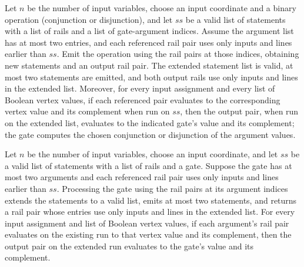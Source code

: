 \begin{theorem}
\label{BoolCircuit.StraightLine.emitOp_spec}
\leanok
{}
Let $n$ be the number of input variables, choose an input coordinate and a binary
operation (conjunction or disjunction), and let $ss$ be a valid list of statements with
a list of rails and a list of gate-argument indices. Assume the argument list has at
most two entries, and each referenced rail pair uses only inputs and lines earlier than
$ss$. Emit the operation using the rail pairs at those indices, obtaining new statements
and an output rail pair. The extended statement list is valid, at most two statements
are emitted, and both output rails use only inputs and lines in the extended list.
Moreover, for every input assignment and every list of Boolean vertex values, if each
referenced pair evaluates to the corresponding vertex value and its complement when run
on $ss$, then the output pair, when run on the extended list, evaluates to the indicated
gate's value and its complement; the gate computes the chosen conjunction or disjunction
of the argument values.
\end{theorem}

\begin{theorem}
\label{BoolCircuit.StraightLine.gateEmit_spec}
\leanok
{}
Let $n$ be the number of input variables, choose an input coordinate, and let $ss$ be a
valid list of statements with a list of rails and a gate. Suppose the gate has at most
two arguments and each referenced rail pair uses only inputs and lines earlier than
$ss$. Processing the gate using the rail pairs at its argument indices extends the
statements to a valid list, emits at most two statements, and returns a rail pair whose
entries use only inputs and lines in the extended list. For every input assignment and
list of Boolean vertex values, if each argument's rail pair evaluates on the existing
run to that vertex value and its complement, then the output pair on the extended run
evaluates to the gate's value and its complement.
\end{theorem}


